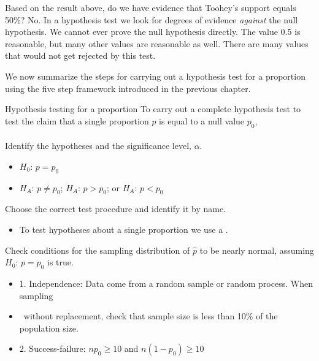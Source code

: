 \begin{examplewrap}
\begin{nexample}{Based on the result above, do we have evidence that Toohey's support equals 50\%?}
No.  In a hypothesis test we look for degrees of evidence \emph{against} the null hypothesis.  We cannot ever prove the null hypothesis directly.  The value 0.5 is reasonable, but many other values are reasonable as well.  There are many values that would not get rejected by this test.
\end{nexample}
\end{examplewrap}

We now summarize the steps for carrying out a hypothesis test for a proportion using the five step framework introduced in the previous chapter.

\begin{onebox}{Hypothesis testing for a proportion}
To carry out a complete hypothesis test to test the claim that a single proportion $p$ is equal to a null value $p_0$,
\\
\\
 Identify the hypotheses and the significance level, $\alpha$.\vspace{-1mm}
\begin{itemize}
\setlength{\itemsep}{0mm}
\item[] $H_0$: $p = p_0$  
\item[]  $H_A$: $p \ne p_0$;  \quad $H_A$: $p > p_0$; \quad or \quad $H_A$: $p < p_0$ 
\end{itemize} 
 Choose the correct test procedure and identify it by name.  \vspace{-1mm}
\begin{itemize}
\item[] To test hypotheses about a single proportion we use a .
\end{itemize}
  Check conditions for the sampling distribution of $\hat{p}$ to be nearly normal, assuming $H_0$: $p=p_0$ is true.\vspace{-1mm}
\begin{itemize}
\setlength{\itemsep}{0mm}
\item[] 1. Independence:  Data come from a random sample or random process.  When sampling 
\item[] \quad \ without replacement, check that sample size is less than 10\% of the population size.
\item[] 2. Success-failure:  $np_0\ge 10$ and $n(1-p_0)\ge 10$

\end{itemize}
\end{onebox}
